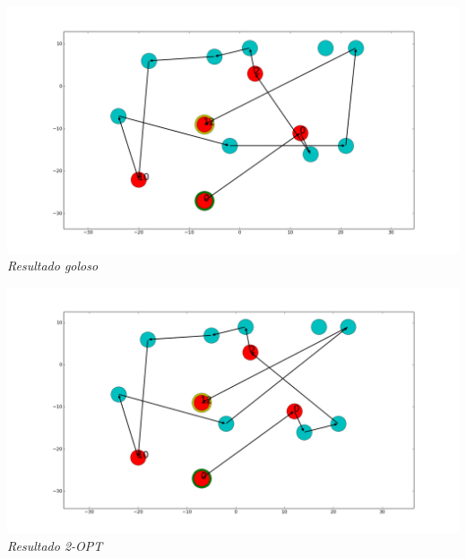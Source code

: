 \vspace*{0.3cm} \vspace*{0.3cm}
  \begin{center}
\includegraphics[scale=0.3]{./EJ5/caminoGoloso.png}
\\{\textit{Resultado goloso}}
  \end{center}
  \vspace*{0.3cm}

  \vspace*{0.3cm} \vspace*{0.3cm}
  \begin{center}
\includegraphics[scale=0.3]{./EJ5/camino2opt.png}
\\{\textit{Resultado 2-OPT}}
  \end{center}
  \vspace*{0.3cm}
  

